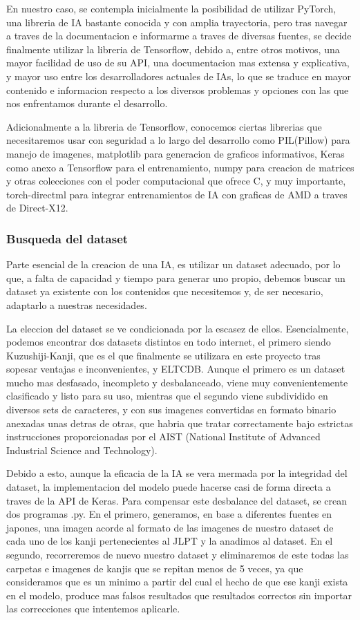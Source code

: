 \documentclass{article}
\begin{document}
En nuestro caso, se contempla inicialmente la posibilidad de utilizar PyTorch, una libreria de IA bastante conocida y con amplia trayectoria, pero tras navegar a traves de la documentacion e informarme a traves de diversas fuentes, se decide finalmente utilizar la libreria de Tensorflow, debido a, entre otros motivos, una mayor facilidad de uso de su API, una documentacion mas extensa y explicativa, y mayor uso entre los desarrolladores actuales de IAs, lo que se traduce en mayor contenido e informacion respecto a los diversos problemas y opciones con las que nos enfrentamos durante el desarrollo.

Adicionalmente a la libreria de Tensorflow, conocemos ciertas librerias que necesitaremos usar con seguridad a lo largo del desarrollo como PIL(Pillow) para manejo de imagenes, matplotlib para generacion de graficos informativos, Keras como anexo a Tensorflow para el entrenamiento, numpy para creacion de matrices y otras colecciones con el poder computacional que ofrece C, y muy importante, torch-directml para integrar entrenamientos de IA con graficas de AMD a traves de Direct-X12.

\subsubsection{Busqueda del dataset}
Parte esencial de la creacion de una IA, es utilizar un dataset adecuado, por lo que, a falta de capacidad y tiempo para generar uno propio, debemos buscar un dataset ya existente con los contenidos que necesitemos y, de ser necesario, adaptarlo a nuestras necesidades.

La eleccion del dataset se ve condicionada por la escasez de ellos. Esencialmente, podemos encontrar dos datasets distintos en todo internet, el primero siendo Kuzushiji-Kanji, que es el que finalmente se utilizara en este proyecto tras sopesar ventajas e inconvenientes, y ELTCDB. Aunque el primero es un dataset mucho mas desfasado, incompleto y desbalanceado, viene muy convenientemente clasificado y listo para su uso, mientras que el segundo viene subdividido en diversos sets de caracteres, y con sus imagenes convertidas en formato binario anexadas unas detras de otras, que habria que tratar correctamente bajo estrictas instrucciones proporcionadas por el AIST (National Institute of Advanced Industrial Science and Technology). 

Debido a esto, aunque la eficacia de la IA se vera mermada por la integridad del dataset, la implementacion del modelo puede hacerse casi de forma directa a traves de la API de Keras.
Para compensar este desbalance del dataset, se crean dos programas .py. En el primero, generamos, en base a diferentes fuentes en japones, una imagen acorde al formato de las imagenes de nuestro dataset de cada uno de los kanji pertenecientes al JLPT y la anadimos al dataset. En el segundo, recorreremos de nuevo nuestro dataset y eliminaremos de este todas las carpetas e imagenes de kanjis que se repitan menos de 5 veces, ya que consideramos que es un minimo a partir del cual el hecho de que ese kanji exista en el modelo, produce mas falsos resultados que resultados correctos sin importar las correcciones que intentemos aplicarle.
\end{document}
